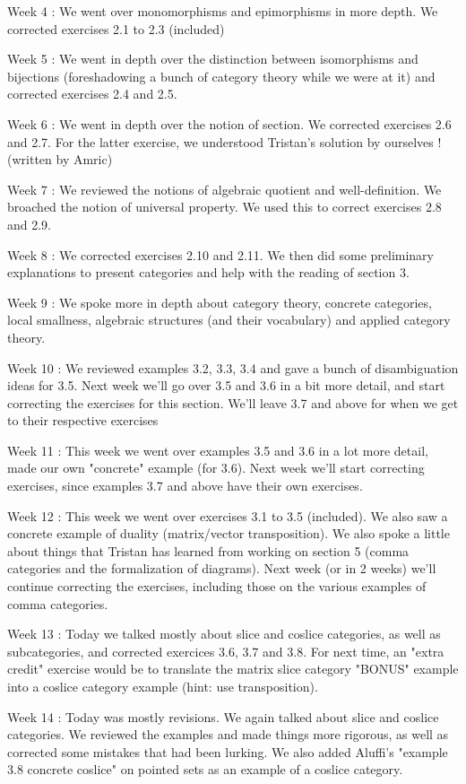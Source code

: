 Week 4 : We went over monomorphisms and epimorphisms in more depth. We corrected exercises 2.1 to 2.3 (included)

Week 5 : We went in depth over the distinction between isomorphisms and bijections (foreshadowing a bunch of category theory while we were at it) and corrected exercises 2.4 and 2.5.

Week 6 : We went in depth over the notion of section. We corrected exercises 2.6 and 2.7. For the latter exercise, we understood Tristan's solution by ourselves ! (written by Amric)

Week 7 : We reviewed the notions of algebraic quotient and well-definition. We broached the notion of universal property. We used this to correct exercises 2.8 and 2.9.

Week 8 : We corrected exercises 2.10 and 2.11. We then did some preliminary explanations to present categories and help with the reading of section 3.

Week 9 : We spoke more in depth about category theory, concrete categories, local smallness, algebraic structures (and their vocabulary) and applied category theory.

Week 10 : We reviewed examples 3.2, 3.3, 3.4 and gave a bunch of disambiguation ideas for 3.5. Next week we'll go over 3.5 and 3.6 in a bit more detail, and start correcting the exercises for this section. We'll leave 3.7 and above for when we get to their respective exercises

Week 11 : This week we went over examples 3.5 and 3.6 in a lot more detail, made our own "concrete" example (for 3.6). Next week we'll start correcting exercises, since examples 3.7 and above have their own exercises. 

Week 12 : This week we went over exercises 3.1 to 3.5 (included). We also saw a concrete example of duality (matrix/vector transposition). We also spoke a little about things that Tristan has learned from working on section 5 (comma categories and the formalization of diagrams). Next week (or in 2 weeks) we'll continue correcting the exercises, including those on the various examples of comma categories.

Week 13 : Today we talked mostly about slice and coslice categories, as well as subcategories, and corrected exercices 3.6, 3.7 and 3.8.
For next time, an "extra credit" exercise would be to translate the matrix slice category "BONUS" example into a coslice category example (hint: use transposition).

Week 14 : Today was mostly revisions. We again talked about slice and coslice categories. We reviewed the examples and made things more rigorous, as well as corrected some mistakes that had been lurking. We also added Aluffi's "example 3.8 concrete coslice" on pointed sets as an example of a coslice category.

